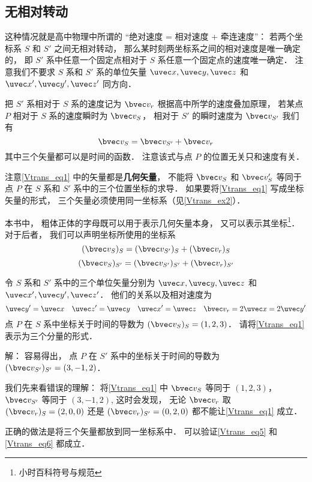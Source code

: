 


\subsection{无相对转动}
这种情况就是高中物理中所谓的 “绝对速度 = 相对速度 + 牵连速度”： 若两个坐标系 $S$ 和 $S'$ 之间无相对转动， 那么某时刻两坐标系之间的相对速度是唯一确定的， 即 $S'$ 系中任意一个固定点相对于 $S$ 系任意一个固定点的速度唯一确定． 注意我们不要求 $S$ 系和 $S'$ 系的单位矢量 $\uvec x, \uvec y, \uvec z$ 和 $\uvec x', \uvec y', \uvec z'$ 同方向．

把 $S'$ 系相对于 $S$ 系的速度记为 $\bvec v_r$ 根据高中所学的速度叠加原理， 若某点 $P$ 相对于 $S$ 系的速度瞬时为 $\bvec v_S$， 相对于 $S'$ 的瞬时速度为 $\bvec v_{S'}$ 我们有
\begin{equation}\label{Vtrans_eq1}
\bvec v_{S} = \bvec v_{S'} + \bvec v_r
\end{equation}
其中三个矢量都可以是时间的函数． 注意该式与点 $P$ 的位置无关只和速度有关．

注意\autoref{Vtrans_eq1} 中的矢量都是\textbf{几何矢量}， 不能将 $\bvec v_S$ 和 $\bvec v_S'$ 等同于点 $P$ 在 $S$ 系和 $S'$ 系中的三个位置坐标的求导． 如果要将\autoref{Vtrans_eq1} 写成坐标矢量的形式， 三个矢量必须使用同一坐标系（见\autoref{Vtrans_ex2}）．

本书中， 粗体正体的字母既可以用于表示几何矢量本身， 又可以表示其坐标\footnote{小时百科符号与规范}． 对于后者， 我们可以声明坐标所使用的坐标系
\begin{equation}\label{Vtrans_eq5}
(\bvec v_{S})_{S} = (\bvec v_{S'})_{S} + (\bvec v_r)_{S}
\end{equation}
\begin{equation}\label{Vtrans_eq6}
(\bvec v_{S})_{S'} = (\bvec v_{S'})_{S'} + (\bvec v_r)_{S'}
\end{equation}

\begin{example}{}\label{Vtrans_ex2}
令 $S$ 系和 $S'$ 系中的三个单位矢量分别为 $\uvec x, \uvec y, \uvec z$ 和 $\uvec x', \uvec y', \uvec z'$． 他们的关系以及相对速度为
\begin{equation}
\uvec y' = \uvec x\quad
\uvec z' = \uvec y\quad
\uvec x' = \uvec z\quad
\bvec v_r = 2\uvec x = 2\uvec y'
\end{equation}
点 $P$ 在 $S$ 系中坐标关于时间的导数为 $(\bvec v_S)_S = (1, 2, 3)$． 请将\autoref{Vtrans_eq1} 表示为三个分量的形式．

解： 容易得出， 点 $P$ 在 $S'$ 系中的坐标关于时间的导数为 $(\bvec v_{S'})_{S'} = (3, -1, 2)$．

我们先来看错误的理解： 将\autoref{Vtrans_eq1} 中 $\bvec v_S$ 等同于 $(1, 2, 3)$， $\bvec v_{S'}$ 等同于 $(3, -1, 2)$,  这时会发现， 无论 $\bvec v_r$ 取 $(\bvec v_r)_S = (2, 0, 0)$ 还是 $(\bvec v_r)_{S'} = (0, 2, 0)$ 都不能让\autoref{Vtrans_eq1} 成立．

正确的做法是将三个矢量都放到同一坐标系中． 可以验证\autoref{Vtrans_eq5} 和\autoref{Vtrans_eq6} 都成立．
\end{example}

